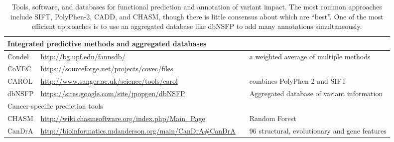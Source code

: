 \documentclass{article}
\begin{document}
\begin{table}[p]
\begin{tabularx}{1.1\textwidth}{p{2.5cm}Xp{3.5cm}p{3.5cm}}
  \multicolumn{4}{l}{Integrated predictive methods and aggregated databases}    \\
  \midrule
  Condel & \url{http://bg.upf.edu/fannsdb/} & \parencite{Gonzalez-Perez2011-gc} & a weighted average of multiple methods \\
  CoVEC & \url{https://sourceforge.net/projects/covec/files} &   &   \\
  CAROL & \url{http://www.sanger.ac.uk/science/tools/carol} &
  \parencite{Lopes2012-je} & combines PolyPhen-2 and SIFT \\
  dbNSFP & \url{https://sites.google.com/site/jpopgen/dbNSFP} &
  \parencite{Liu2016-iv} & Aggregated database of variant information \\
  \midrule
  \multicolumn{4}{l}{Cancer-specific prediction tools}    \\
  \midrule
  CHASM & \url{http://wiki.chasmsoftware.org/index.php/Main_Page} &
  \parencite{Carter2009-ci} & Random Forest \\
  CanDrA & \url{http://bioinformatics.mdanderson.org/main/CanDrA\#CanDrA} & \parencite{Mao2013-ie} & 96 structural, evolutionary and gene features  \\
   \bottomrule
\end{tabularx}
\caption{Tools, software, and databases for functional prediction and
  annotation of variant impact. The most common approaches include
  SIFT, PolyPhen-2, CADD, and CHASM, though there is little consensus
  about which are ``best''. One of the most efficient approaches is to
use an aggregated database like dbNSFP to add many annotations
simultaneously. }
\label{table:2}
\end{table}
\end{document}
